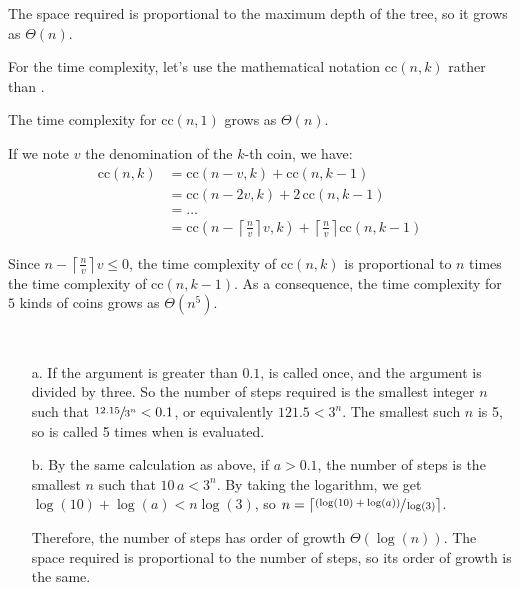 \begin{exe}[1.14]
    The space required is proportional to the maximum depth of the tree, so it 
    grows as $\Theta(n)$.

    For the time complexity, let’s use the mathematical notation $\text{cc}(n, 
    k)$ rather than .

    The time complexity for $\text{cc}(n, 1)$ grows as $\Theta(n)$.

    If we note $v$ the denomination of the $k$-th coin, we have:
    \begin{align*}
        \text{cc}(n, k) &= \text{cc}(n - v, k) + \text{cc}(n, k - 1) \\
                        &= \text{cc}(n - 2v, k) + 2\, \text{cc}(n, k - 1) \\
                        &= … \\
                        &= \text{cc}(n - \left\lceil \frac{n}{v} \right\rceil v, 
                        k) + \left\lceil \frac{n}{v} \right\rceil \text{cc}(n, 
                        k - 1)
    \end{align*}

    Since $n - \left\lceil \frac{n}{v} \right\rceil v \leq 0$, the time 
    complexity of $\text{cc}(n, k)$ is proportional to $n$ times the time 
    complexity of $\text{cc}(n, k - 1)$. As a consequence, the time complexity 
    for $5$ kinds of coins grows as $\Theta(n^5)$.
\end{exe}

\begin{exe}[1.15]
    \ \vspace{-20pt}
    \begin{itemize}
        \item[a.] If the argument is greater than $0.1$,  is called 
            once, and the argument is divided by three. So the number of steps 
            required is the smallest integer $n$ such that $\sfrac{12.15}{3^n} 
            < 0.1$, or equivalently $121.5 < 3^n$. The smallest such $n$ is 5, 
            so  is called 5 times when  is evaluated.
        \item[b.] By the same calculation as above, if $a > 0.1$, the number of 
            steps is the smallest $n$ such that $10 \, a < 3^n$. By taking the 
            logarithm, we get $\log(10) + \log(a) < n \log(3)$, so $n 
            = \left\lceil \sfrac{(\log(10) + \log(a))}{\log(3)} \right\rceil$.

            Therefore, the number of steps has order of growth 
            $\Theta(\log(n))$. The space required is proportional to the number 
            of steps, so its order of growth is the same.
    \end{itemize}
\end{exe}

